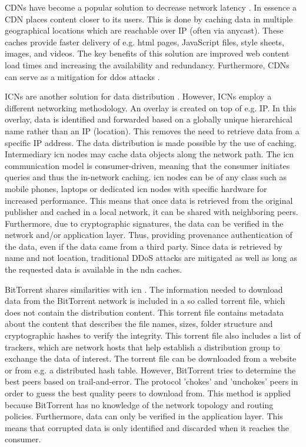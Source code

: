 CDNs have become a popular solution to decrease network latency \cite{lee2012towards}. In essence a CDN places content closer to its users. This is done by caching data in multiple geographical locations which are reachable over IP (often via anycast). These caches provide faster delivery of e.g. \gls{html} pages, JavaScript files, style sheets, images, and videos. The key benefits of this solution are improved web content load times and increasing the availability and redundancy. Furthermore, CDNs can serve as a mitigation for \gls{ddos} attacks \cite{cloudflare-cdn}.

ICNs are another solution for data distribution \cite{jacobson2009networking}. However, ICNs employ a different networking methodology. An overlay is created on top of e.g. IP. In this overlay, data is identified and forwarded based on a globally unique hierarchical name rather than an IP (location). This removes the need to retrieve data from a specific IP address. The data distribution is made possible by the use of caching. Intermediary \gls{icn} nodes may cache data objects along the network path. The \gls{icn} communication model is consumer-driven, meaning that the consumer initiates queries and thus the in-network caching. \gls{icn} nodes can be of any class such as mobile phones, laptops or dedicated \gls{icn} nodes with specific hardware for increased performance. This means that once data is retrieved from the original publisher and cached in a local network, it can be shared with neighboring peers. Furthermore, due to cryptographic signatures, the data can be verified in the network and/or application layer. Thus, providing provenance authentication of the data, even if the data came from a third party. Since data is retrieved by name and not location, traditional DDoS attacks are mitigated as well as long as the requested data is available in the \gls{ndn} caches.

BitTorrent shares similarities with \gls{icn} \cite{mastorakis2017ntorrent}. The information needed to download data from the BitTorrent network is included in a so called torrent file, which does not contain the distribution content. This torrent file contains metadata about the content that describes the file names, sizes, folder structure and cryptographic hashes to verify the integrity. This torrent file also includes a list of trackers, which are network hosts that help establish a distribution group to exchange the data of interest. The torrent file can be downloaded from a website or from e.g. a distributed hash table. However, BitTorrent tries to determine the best peers based on trail-and-error. The protocol 'chokes' and 'unchokes' peers in order to guess the best quality peers to download from. This method is applied because BitTorrent has no knowledge of the network topology and routing policies. Furthermore, data can only be verified in the application layer. This means that corrupted data is only identified and discarded when it reaches the consumer.

